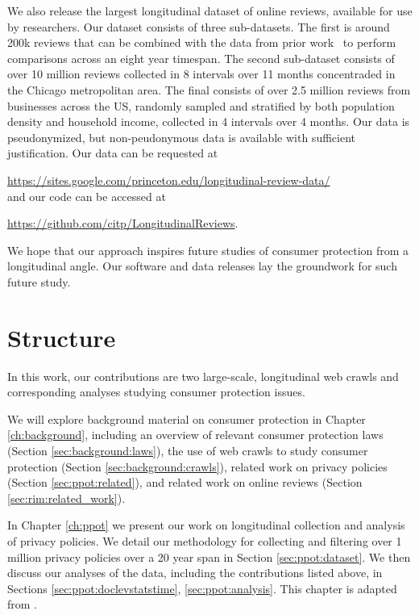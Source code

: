 We also release the largest longitudinal dataset of online reviews, available for use by researchers. Our dataset consists of three sub-datasets. The first is around 200k reviews that can be combined with the data from prior work~\cite{mukherjee2013yelp} to perform comparisons across an eight year timespan. The second sub-dataset consists of over 10 million reviews collected in 8 intervals over 11 months concentraded in the Chicago metropolitan area. The final consists of over 2.5 million reviews from businesses across the US, randomly sampled and stratified by both population density and household income, collected in 4 intervals over 4 months. Our data is pseudonymized, but non-peudonymous data is available with sufficient justification. Our data can be requested at\par
\url{https://sites.google.com/princeton.edu/longitudinal-review-data/}\\
and our code can be accessed at\par
\url{https://github.com/citp/LongitudinalReviews}.

We hope that our approach inspires future studies of consumer protection from a longitudinal angle. Our software and data releases lay the groundwork for such future study. 






\section{Structure}

In this work, our contributions are two large-scale, longitudinal web crawls and corresponding analyses studying consumer protection issues. 

We will explore background material on consumer protection in Chapter \ref{ch:background}, including an overview of relevant consumer protection laws (Section \ref{sec:background:laws}), the use of web crawls to study consumer protection (Section \ref{sec:background:crawls}), related work on privacy policies (Section \ref{sec:ppot:related}), and related work on online reviews (Section \ref{sec:rim:related_work}).

In Chapter \ref{ch:ppot} we present our work on longitudinal collection and analysis of privacy policies. We detail our methodology for collecting and filtering over 1 million privacy policies over a 20 year span in Section \ref{sec:ppot:dataset}. We then discuss our analyses of the data, including the contributions listed above, in Sections \ref{sec:ppot:doclevstatstime}, \ref{sec:ppot:analysis}. This chapter is adapted from \citet{amos2021privacy}.

